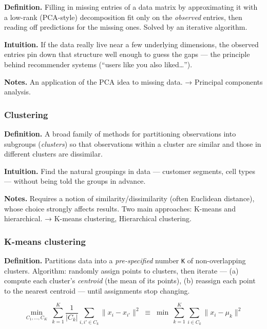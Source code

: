 \documentclass[
  10pt,
  letterpaper,
  onecolumn]{article}
\begin{document}
\textbf{Definition.} Filling in missing entries of a data matrix by
approximating it with a low-rank (PCA-style) decomposition fit only on
the \emph{observed} entries, then reading off predictions for the
missing ones. Solved by an iterative algorithm.

\textbf{Intuition.} If the data really live near a few underlying
dimensions, the observed entries pin down that structure well enough to
guess the gaps --- the principle behind recommender systems (``users
like you also liked\ldots{}'').

\textbf{Notes.} An application of the PCA idea to missing data. →
Principal components analysis.

\hypertarget{clustering}{%
\subsubsection{Clustering}\label{clustering}}

\textbf{Definition.} A broad family of methods for partitioning
observations into subgroups (\emph{clusters}) so that observations
within a cluster are similar and those in different clusters are
dissimilar.

\textbf{Intuition.} Find the natural groupings in data --- customer
segments, cell types --- without being told the groups in advance.

\textbf{Notes.} Requires a notion of similarity/dissimilarity (often
Euclidean distance), whose choice strongly affects results. Two main
approaches: K-means and hierarchical. → K-means clustering, Hierarchical
clustering.

\hypertarget{k-means-clustering}{%
\subsubsection{K-means clustering}\label{k-means-clustering}}

\textbf{Definition.} Partitions data into a \emph{pre-specified} number
\texttt{K} of non-overlapping clusters. Algorithm: randomly assign
points to clusters, then iterate --- (a) compute each cluster's
\emph{centroid} (the mean of its points), (b) reassign each point to the
nearest centroid --- until assignments stop changing.

\begin{equation*}
\min_{C_1,\dots,C_K}\ \sum_{k=1}^{K}\frac{1}{|C_k|}\sum_{i,i'\in C_k}\|x_i-x_{i'}\|^2
\;\equiv\;
\min\ \sum_{k=1}^{K}\sum_{i\in C_k}\|x_i-\mu_k\|^2
\end{equation*}
\end{document}
